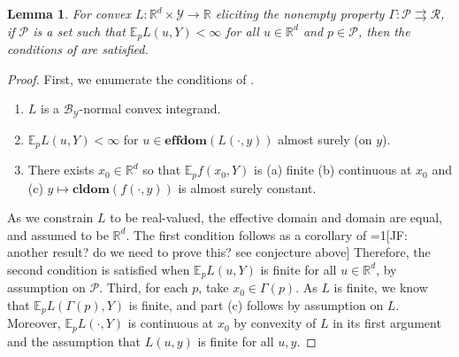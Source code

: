 \documentclass[12pt]{article}
\newcommand{\Comments}{1}
\newcommand{\mynote}[2]{\ifnum\Comments=1\textcolor{#1}{#2}\fi}
\newcommand{\jessie}[1]{\mynote{green!75!black}{[JF: #1]}}
\newcommand{\reals}{\mathbb{R}}
\newcommand{\toto}{\rightrightarrows}
\newcommand{\B}{\mathcal{B}}
\newcommand{\E}{\mathbb{E}}
\renewcommand{\P}{\mathcal{P}}
\newcommand{\R}{\mathcal{R}}
\newcommand{\Y}{\mathcal{Y}}
\newcommand{\cl}{\mathbf{cl}}
\newcommand{\dom}{\mathbf{dom}}
\newcommand{\effdom}{\mathbf{effdom}}
\newtheorem{lemma}{Lemma}
\begin{document}
\begin{lemma}\label{lem:conditions-sat}
	For convex $L : \reals^d \times \Y \to \reals$ eliciting the nonempty property $\Gamma:\P\toto\R$, if $\P$ is a set such that $\E_p L(u,Y) < \infty$ for all $u \in \reals^d$ and $p \in \P$, then the conditions of \cite[Corollary 1]{rockafellar1982interchange} are satisfied.
\end{lemma}
\begin{proof}
	First, we enumerate the conditions of \cite[Corollary 1]{rockafellar1982interchange}.\begin{enumerate}
		\item $L$ is a $\B_\Y$-normal convex integrand.
		\item $\E_p L(u,Y) < \infty$ for $u \in \effdom(L(\cdot,y))$ almost surely (on $y$).
		\item There exists $x_0 \in \reals^d$ so that $\E_p f(x_0, Y)$ is (a) finite (b) continuous at $x_0$ and (c) $y \mapsto \cl \dom (f(\cdot, y))$ is almost surely constant.
	\end{enumerate}


As we constrain $L$ to be real-valued, the effective domain and domain are equal, and assumed to be $\reals^d$.
The first condition follows as a corollary of \jessie{another result? do we need to prove this?  see conjecture above}
Therefore, the second condition is satisfied when $\E_p L(u,Y)$ is finite for all $u \in \reals^d$, by assumption on $\P$.
Third, for each $p$, take $x_0 \in \Gamma(p)$.
As $L$ is finite, we know that $\E_p L(\Gamma(p), Y)$ is finite, and part (c) follows by assumption on $L$.
Moreover, $\E_p L(\cdot, Y)$ is continuous at $x_0$ by convexity of $L$ in its first argument and the assumption that $L(u,y)$ is finite for all $u,y$.
\end{proof}



\end{document}
